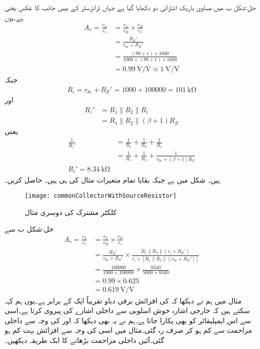 حل:شکل  ب میں مساوی باریک اشاراتی دو دکھایا گیا ہے جہاں  ٹرانزسٹر کے بیس جانب  کا عکس یعنی   ہے۔یوں
\begin{align*}
A_v=\frac{v_L}{v_s}&=\frac{v_L}{v_B} \times \frac{v_B}{v_s}\\
&=\frac{R_E'}{r_{be}+R_E'}\\
&=\frac{\left(99+1 \right) \times 1000}{1000+\left(99+1 \right)  \times 1000}\\
&=\SI[per=frac,fraction=nice]{0.99}{\volt \per \volt} \approx \SI[per=frac,fraction=nice]{1}{\volt \per \volt} 
\end{align*}
جبکہ
\begin{align*}
R_i=r_{be}+R_E'=1000+100000=\SI{101}{\kilo \ohm}
\end{align*}
اور
\begin{align*}
R_i'&=R_1 \mathbin{\|} R_2 \mathbin{\|} R_i\\
&=R_1 \mathbin{\|} R_2 \mathbin{\|} \left(\beta+1 \right) R_E
\end{align*}
یعنی
\begin{align*}
\frac{1}{R_i'}&=\frac{1}{R_1}+\frac{1}{R_2}+\frac{1}{R_i}\\
&=\frac{1}{R_1}+\frac{1}{R_2}+\frac{1}{r_{be}+\left(\beta+1 \right) R_E}\\
R_i'=\SI{8.34}{\kilo \ohm}
\end{align*}
ہیں۔
شکل  میں  ہے جبکہ بقایا تمام متغیرات مثال  کی ہی ہیں۔ حاصل کریں۔
\begin{figure}
\centering
\texttt{[image: commonCollectorWithSourceResistor]}
\caption{کلکٹر  مشترک کی دوسری مثال}
\label{شکل_ٹرانزسٹر_کلکٹر _مشترک_دوسری_مثال}
\end{figure}

حل:شکل  ب سے
\begin{align*}
A_v=\frac{v_L}{v_s}&=\frac{v_L}{v_B} \times \frac{v_B}{v_s}\\
&=\frac{R_E'}{r_{be}+R_E'} \times \frac{R_1 \mathbin{\|} R_2 \mathbin{\|} \left(r_i+R_E' \right)}{r_i+[R_1 \mathbin{\|} R_2 \mathbin{\|} \left(r_{be}+R_E' \right)]}\\
&=\frac{100000}{1000+100000} \times \frac{8340}{5000+8340}\\
&=0.99 \times 0.625\\
&=\SI[per =frac,fraction=nice]{0.619}{\volt \per \volt}
\end{align*}
مثال  میں ہم نے دیکھا کہ  کی افزائش برقی دباو تقریباً ایک کے برابر ہے۔یوں ہم کہہ سکتے ہیں کہ خارجی اشارہ خوش اسلوبی سے داخلی اشارے کی پیروی کرتا ہے۔اسی سے اس ایمپلیفائر کو  بھی پکارا جاتا ہے۔ہم نے یہ بھی دیکھا کہ  اور  کی وجہ سے داخلی مزاحمت  سے کم ہو کر صرف  رہ  گئی۔مثال  میں اسی کی وجہ سے افزائش بہت کم ہو گئی۔آئیں داخلی مزاحمت بڑھانے کا ایک طریقہ دیکھیں۔


